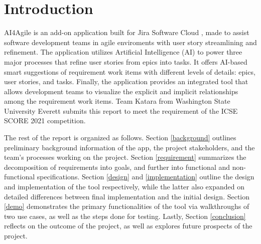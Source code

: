 \section{Introduction}
AI4Agile is an add-on application built for Jira Software Cloud \cite{jira2}, made to assist software development teams in agile enviroments with user story streamlining and refinement. The application utilizes Artificial Intelligence (AI) to power three major processes that refine user stories from epics into tasks. It offers AI-based smart suggestions of requirement work items with different levels of details: epics, user stories, and tasks. Finally, the application provides an integrated tool that allows development teams to visualize the explicit and implicit relationships among the requirement work items. Team Katara from Washington State University Everett submits this report to meet the requirement of the ICSE SCORE 2021 competition. 

The rest of the report is organized as follows. Section \ref{background} outlines preliminary background information of the app, the project stakeholders, and the team's processes working on the project. Section \ref{requirement} summarizes the decomposition of requirements into goals, and further into functional and non-functional specifications. Section \ref{design} and \ref{implementation} outline the design and implementation of the tool respectively, while the latter also expanded on detailed differences between final implementation and the initial design. Section \ref{demo} demonstrates the primary functionalities of the tool via walkthroughs of two use cases, as well as the steps done for testing. Lastly, Section 
\ref{conclusion} reflects on the outcome of the project, as well as explores future prospects of the project. 

